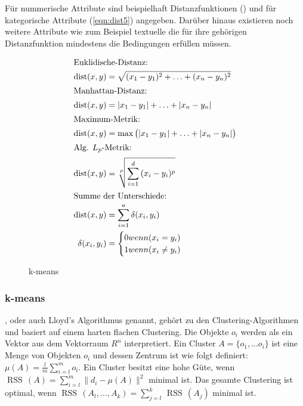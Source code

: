 \documentclass[12pt,journal,compsoc,ngerman]{IEEEtran}
\DeclareMathOperator{\dist}{dist}
\DeclareMathOperator{\RSS}{RSS}
\begin{document}
Für nummerische Attribute sind beispielhaft Distanzfunktionen () und für kategorische Attribute (\cref{eqn:dist5}) angegeben. Darüber hinaus existieren noch weitere Attribute wie zum Beispiel textuelle die für ihre gehörigen Distanzfunktion mindestens die Bedingungen  erfüllen müssen.

{
\small
\setlength{\belowdisplayskip}{0pt}%
\setlength{\abovedisplayskip}{0pt}%
\begin{align}
\intertext{Euklidische-Distanz:} 
\dist(x,y) &= \sqrt{(x_1 - y_1)^2 + \ldots + (x_n - y_n)^2}\label{eqn:dist1}\\
\intertext{Manhattan-Distanz:}
\dist(x,y) &= |x_1 - y_1| + \ldots + |x_n - y_n|\label{eqn:dist2}\\
\intertext{Maximum-Metrik:} 
\dist(x,y) &= \max\big(|x_1 - y_1| + \ldots + |x_n - y_n|\big)\label{eqn:dist3}\\
\intertext{Alg. $L_p$-Metrik:}
\dist(x,y) &= \sqrt[p]{\sum\limits_{i=1}^{d}{(x_i-y_i)^p}}\label{eqn:dist4}\\
\intertext{Summe der Unterschiede:} 
 \dist(x,y) &= \sum\limits_{i=1}^{a}\delta(x_i, y_i)\label{eqn:dist5}\\
 \delta(x_i, y_i) &= \begin{cases}
 0 \mbox{ wenn } (x_i = y_i)\\
 1 \mbox{ wenn } (x_i \neq y_i)
 \end{cases} 
 \end{align} 
 }

\begin{figure}[!t]
\centering
\subfigure[Phase 1 -- 3]{\scalebox{0.5}{}\label{fig:p1-3_k-means}}
\subfigure[Phase 4]{\scalebox{0.5}{}\label{fig:p4_k-means}}
\subfigure[Phase 5]{\scalebox{0.5}{}\label{fig:p5_k-means}}
\subfigure[Phase 6]{\scalebox{0.5}{}\label{fig:p6_k-means}}
\caption{k-means}
\label{fig:k-means}
\end{figure}
 
\subsubsection{k-means} \label{sec:k-means}
, oder auch Lloyd's Algorithmus genannt, gehört zu den Clustering-Algorithmen und basiert auf einem harten flachen Clustering. Die Objekte $o_i$ werden als ein Vektor aus dem Vektorraum $R^n$ interpretiert. Ein Cluster $A = \{o_1, \ldots o_i\}$ ist eine Menge von Objekten $o_i$ und dessen Zentrum ist wie folgt definiert: $\mu(A) = \frac{l}{m}\sum\limits_{i=l}^{m}o_i$. Ein Cluster besitzt eine hohe Güte, wenn $\RSS\,(A) = \sum\limits_{i=l}^{m}\big\|d_i - \mu(A)\big\|^2$ minimal ist. Das gesamte Clustering ist optimal, wenn $\RSS\,(A_l, \ldots, A_k) = \sum\limits_{j=l}^{k}\,\RSS\,(A_j)$ minimal ist. 
\end{document}
